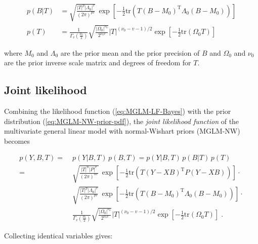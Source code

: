 \vspace{-0.5em}
\begin{equation} \label{eq:MGLM-NW-prior-pdf}
\begin{split}
p(B|T) &= \sqrt{\frac{|T|^p |\Lambda_0|^v}{(2 \pi)^{pv}}} \, \exp\left[ -\frac{1}{2} \mathrm{tr}\left( T (B-M_0)^\mathrm{T} \Lambda_0 (B-M_0) \right) \right] \\
p(T) &= \frac{1}{\Gamma_v \left( \frac{\nu_0}{2} \right)} \sqrt{\frac{|\Omega_0|^{\nu_0}}{2^{\nu_0 v}}} |T|^{(\nu_0-v-1)/2} \exp\left[ -\frac{1}{2} \mathrm{tr}\left( \Omega_0 T \right) \right]
\end{split}
\end{equation}

where $M_0$ and $\Lambda_0$ are the prior mean and the prior precision of $B$ and $\Omega_0$ and $\nu_0$ are the prior inverse scale matrix and degrees of freedom for $T$.


\subsection{Joint likelihood} \label{sec:MGLM-NW-JL}

Combining the likelihood function (\ref{eq:MGLM-LF-Bayes}) with the prior distribution (\ref{eq:MGLM-NW-prior-pdf}), the \textit{joint likelihood function} of the multivariate general linear model with normal-Wishart priors (MGLM-NW) becomes

\vspace{-0.5em}
\begin{equation} \label{eq:MGLM-NW-JL1}
\begin{split}
p(Y,B,T) = \; & p(Y|B,T) \, p(B,T) =  p(Y|B,T) \, p(B|T) \, p(T)\\
= \; & \sqrt{\frac{|T|^n |P|^v}{(2 \pi)^{nv}}} \, \exp\left[ -\frac{1}{2} \mathrm{tr}\left( T (Y-XB)^\mathrm{T} P (Y-XB) \right) \right] \cdot \\
& \sqrt{\frac{|T|^p |\Lambda_0|^v}{(2 \pi)^{pv}}} \, \exp\left[ -\frac{1}{2} \mathrm{tr}\left( T (B-M_0)^\mathrm{T} \Lambda_0 (B-M_0) \right) \right] \cdot \\
& \frac{1}{\Gamma_v \left( \frac{\nu_0}{2} \right)} \sqrt{\frac{|\Omega_0|^{\nu_0}}{2^{\nu_0 v}}} |T|^{(\nu_0-v-1)/2} \exp\left[ -\frac{1}{2} \mathrm{tr}\left( \Omega_0 T \right) \right] \; .
\end{split}
\end{equation}

Collecting identical variables gives:

